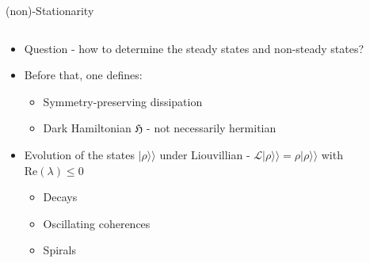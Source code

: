 \documentclass[10pt,xcolor={table,dvipsnames},t]{beamer}
\newcommand{\kett}[1]{\vert #1 \rangle\!\rangle}
\begin{document}
\begin{frame}{(non)-Stationarity}
  \begin{columns}
\begin{column}{0.6\textwidth}
  \begin{itemize}
    \item<1-> Question - how to determine the steady states and non-steady states?
    \item<2-> Before that, one defines:
      \begin{itemize}
        \item Symmetry-preserving dissipation
        \item Dark Hamiltonian $\mathfrak{H}$ - not necessarily hermitian
      \end{itemize}
    \item<3-> Evolution of the states $\kett{\rho}$ under Liouvillian - $\mathcal{L}\kett{\rho} = \rho \kett{\rho}$
      with $\text{Re}(\lambda) \leq 0 $
      \begin{itemize}
        \item<4-> Decays
        \item<4-> Oscillating coherences
        \item<4-> Spirals
      \end{itemize}
  \end{itemize}
\end{column}
    \begin{column}{0.4\textwidth}


\end{column}
\end{columns}
\end{frame}
\end{document}
